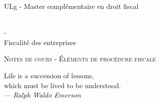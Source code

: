 \documentclass{book}
\begin{document}
\sffamily
\newcommand{\RPoint}{\protect\texttt{[image: point.png]}}
\newcommand{\RSave}{\protect\texttt{[image: Save.png]}}
\renewcommand\labelitemii{\ding{220}}
\begin{titlepage}

\begin{center}
\begin{Large}ULg - Master complémentaire en droit fiscal\end{Large}\\
\vspace{0.5cm}- \\
\vspace{0.5cm}
Fiscalité des entreprises

\end{center}
\vspace{6cm}

\LARGE
\begin{center}
\textsc{Notes de cours - Éléments de procédure fiscale}\\
\end{center}

\vspace{10.0cm}

\normalsize
{}

\end{titlepage}

\newpage

\thispagestyle{empty}
\setcounter{page}{0}
\null

\newpage
\thispagestyle{empty}
\setcounter{page}{0}
\vspace{20cm}

\vfill
\begin{flushright}
Life is a succession of lessons, \\
which must be lived to be understood. \\ 
--- \textit{Ralph Waldo Emerson}
\end{flushright}
\vfill
\newpage

\renewcommand{\chaptermark}[1]{\markboth{#1}{}}
\renewcommand{\sectionmark}[1]{\markright{\thesection\ #1}}
\fancyhf{} \fancyhead[LE,RO]{\bfseries\thepage}
\fancyhead[LO]{\bfseries\rightmark}
\fancyhead[RE]{\bfseries\leftmark}
\renewcommand{\headrulewidth}{0.5pt}
\addtolength{\headheight}{0.5pt}
\renewcommand{\footrulewidth}{0pt}
\fancypagestyle{plain}{ \fancyhead{}
\renewcommand{\headrulewidth}{0pt}}
\end{document}
